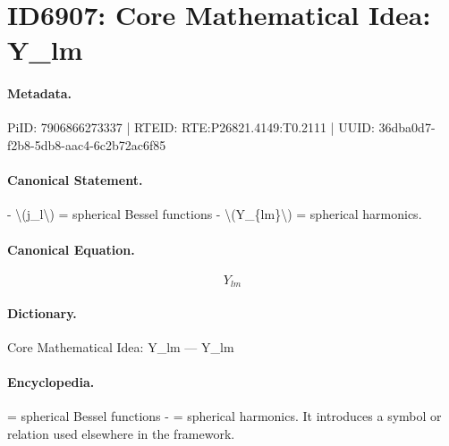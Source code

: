 \section*{ID6907: Core Mathematical Idea: Y\_lm}
\paragraph{Metadata.}
PiID: 7906866273337 | RTEID: RTE:P26821.4149:T0.2111 | UUID: 36dba0d7-f2b8-5db8-aac4-6c2b72ac6f85

\paragraph{Canonical Statement.}
- \textbackslash{}(j\_l\textbackslash{}) = spherical Bessel functions - \textbackslash{}(Y\_\{lm\}\textbackslash{}) = spherical harmonics.

\paragraph{Canonical Equation.}
\[
Y_{lm}
\]

\paragraph{Dictionary.}
Core Mathematical Idea: Y\_lm — Y\_lm

\paragraph{Encyclopedia.}
= spherical Bessel functions - = spherical harmonics. It introduces a symbol or relation used elsewhere in the framework.
